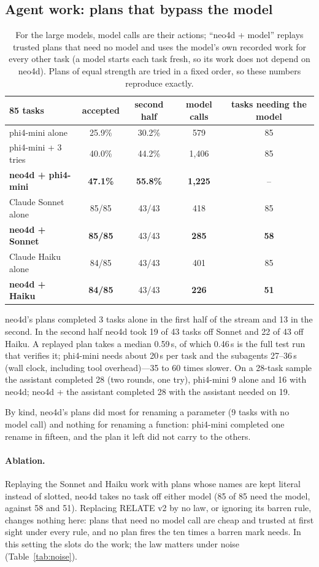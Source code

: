\documentclass[10pt]{article}
\begin{document}
\subsection{Agent work: plans that bypass the model}
\label{sec:agent}
\begin{table}[H]
\centering\small
\begin{tabular}{lcccc}
\toprule
85 tasks & accepted & second half & model calls & tasks needing the model\\
\midrule
phi4-mini alone & 25.9\% & 30.2\% & 579 & 85\\
phi4-mini + 3 tries & 40.0\% & 44.2\% & 1{,}406 & 85\\
\textbf{neo4d + phi4-mini} & \textbf{47.1\%} & \textbf{55.8\%} & \textbf{1{,}225} & --\\
\midrule
Claude Sonnet alone & 85/85 & 43/43 & 418 & 85\\
\textbf{neo4d + Sonnet} & \textbf{85/85} & 43/43 & \textbf{285} & \textbf{58}\\
Claude Haiku alone & 84/85 & 43/43 & 401 & 85\\
\textbf{neo4d + Haiku} & \textbf{84/85} & 43/43 & \textbf{226} & \textbf{51}\\
\bottomrule
\end{tabular}
\caption{For the large models, model calls are their actions; ``neo4d + model'' replays trusted plans that need no
model and uses the model's own recorded work for every other task (a model starts each task fresh, so its work does
not depend on neo4d). Plans of equal strength are tried in a fixed order, so these numbers reproduce exactly.}
\label{tab:agent}
\end{table}
neo4d's plans completed 3 tasks alone in the first half of the stream and 13 in the second. In the second half
neo4d took 19 of 43 tasks off Sonnet and 22 of 43 off Haiku. A replayed plan takes a median 0.59\,s, of which 0.46\,s
is the full test run that verifies it; phi4-mini needs about 20\,s per task and the subagents 27--36\,s (wall clock,
including tool overhead)---35 to 60 times slower. On a 28-task sample the assistant completed 28 (two rounds, one
try), phi4-mini 9 alone and 16 with neo4d; neo4d + the assistant completed 28 with the assistant needed on 19.

By kind, neo4d's plans did most for renaming a parameter (9 tasks with no model call) and nothing for renaming a
function: phi4-mini completed one rename in fifteen, and the plan it left did not carry to the others.

\paragraph{Ablation.} Replaying the Sonnet and Haiku work with plans whose names are kept literal instead of slotted,
neo4d takes no task off either model (85 of 85 need the model, against 58 and 51). Replacing RELATE v2 by no law, or
ignoring its barren rule, changes nothing here: plans that need no model call are cheap and trusted at first sight
under every rule, and no plan fires the ten times a barren mark needs. In this setting the slots do the work; the law
matters under noise (Table~\ref{tab:noise}).
\end{document}
